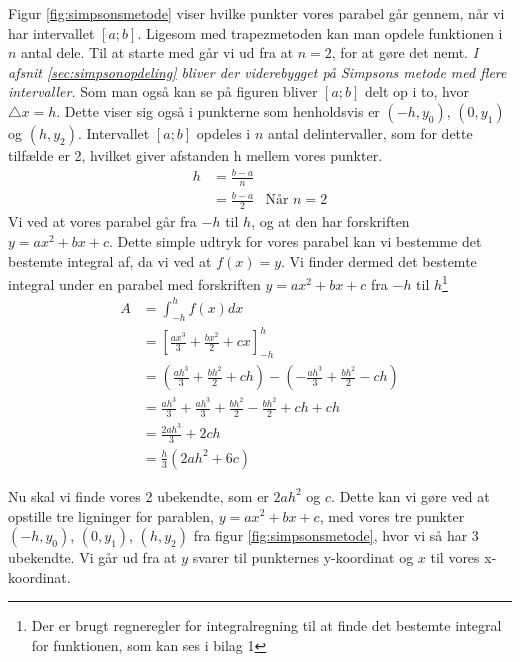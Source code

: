 \documentclass[12pt]{article}
\numberwithin{equation}{section}
\begin{document}
Figur \ref{fig:simpsonsmetode} viser hvilke punkter vores parabel går gennem, når vi har intervallet $[a;b]$. Ligesom med trapezmetoden kan man opdele funktionen i $n$ antal dele. Til at starte med går vi ud fra at $n=2$, for at gøre det nemt. \emph{I afsnit \ref{sec:simpsonopdeling} bliver der viderebygget på Simpsons metode med flere intervaller.}
Som man også kan se på figuren bliver $[a;b]$ delt op i to, hvor $\triangle x=h$. Dette viser sig også i punkterne som henholdsvis er $(-h,y_0)$, $(0,y_1)$ og $(h,y_2)$. Intervallet $[a;b]$ opdeles i $n$ antal delintervaller, som for dette tilfælde er 2, hvilket giver afstanden h mellem vores punkter.
\begin{align}
h &= \frac{b-a}{n} \nonumber
\\&= \frac{b-a}{2} &\text{Når } n=2
\end{align}
Vi ved at vores parabel går fra $-h$ til $h$, og at den har forskriften $y=ax^2+bx+c$. Dette simple udtryk for vores parabel kan vi bestemme det bestemte integral af, da vi ved at $f(x)=y$. Vi finder dermed det bestemte integral under en parabel med forskriften $y=ax^2+bx+c$ fra $-h$ til $h$\footnote{Der er brugt regneregler for integralregning til at finde det bestemte integral for funktionen, som kan ses i bilag 1}
\begin{align}
\label{eq:integral-hh}
A &=\int_{-h}^{h}f(x)dx \nonumber
\\ &=\left[ \frac{ax^3}{3} + \frac{bx^2}{2} + cx \right]_{-h}^{h} \nonumber
\\ &= \left( \frac{ah^3}{3} + \frac{bh^2}{2} + ch \right) - \left( -\frac{ah^3}{3} + \frac{bh^2}{2} - ch \right) \nonumber
\\ &= \frac{ah^3}{3} + \frac{ah^3}{3} + \frac{bh^2}{2} - \frac{bh^2}{2} + ch + ch \nonumber
\\ &= \frac{2ah^3}{3} + 2ch \nonumber
\\ &= \frac{h}{3}(2ah^2+6c)
\end{align}

Nu skal vi finde vores 2 ubekendte, som er $2ah^2$ og $c$. Dette kan vi gøre ved at opstille tre ligninger for parablen, $y=ax^2+bx+c$, med vores tre punkter $(-h,y_0)$, $(0,y_1)$, $(h,y_2)$ fra figur \ref{fig:simpsonsmetode}, hvor vi så har 3 ubekendte. Vi går ud fra at $y$ svarer til punkternes y-koordinat og $x$ til vores x-koordinat.
\end{document}
